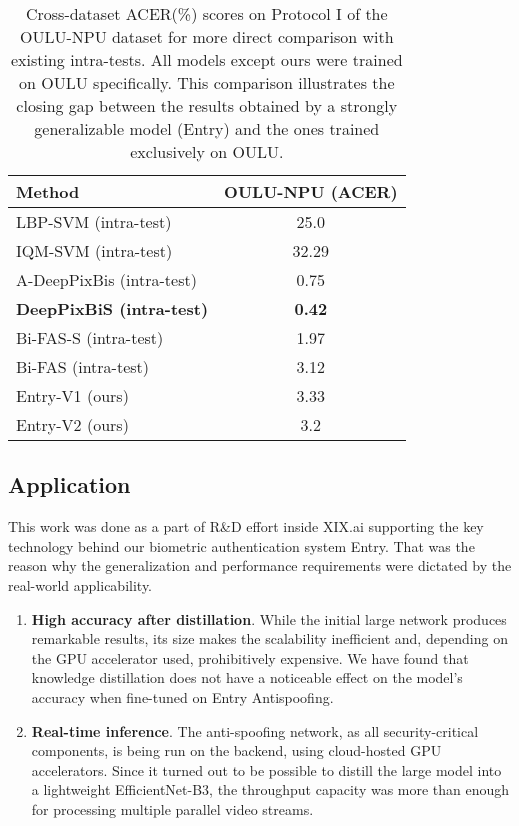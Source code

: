\documentclass[10pt,twocolumn,letterpaper]{article}
\begin{document}
\begin{table}[h]
  \centering
  \begin{tabular}{@{}lc@{}}
    \toprule
    \textbf{Method} & \textbf{OULU-NPU (ACER)} \\
    \midrule
    \midrule
    LBP-SVM (intra-test)\cite{DeepPix} & 25.0 \\
    IQM-SVM (intra-test)\cite{IQM} & 32.29 \\
    A-DeepPixBis (intra-test)\cite{DeepPixBis} & 0.75 \\
    \textbf{DeepPixBiS (intra-test)}\cite{DeepPix} & \textbf{0.42} \\
    Bi-FAS-S (intra-test)\cite{Bi-FPNFAS} & 1.97\\
    Bi-FAS (intra-test)\cite{Bi-FPNFAS} & 3.12\\
    Entry-V1 (ours) & 3.33 \\
    Entry-V2 (ours) & 3.2 \\
    \bottomrule
  \end{tabular}
  \caption{Cross-dataset ACER(\%) scores on Protocol I of the OULU-NPU dataset for more direct comparison with existing intra-tests. All models except ours were trained on OULU specifically. This comparison illustrates the closing gap between the results obtained by a strongly generalizable model (Entry) and the ones trained exclusively on OULU.}
  \label{tab:cross-test}
\end{table}

\subsection{Application}


This work was done as a part of R\&D effort inside XIX.ai supporting the key technology behind our biometric authentication system Entry. That was the reason why the generalization and performance requirements were dictated by the real-world applicability. 

\begin{enumerate}
    \item \textbf{High accuracy after distillation}. While the initial large network produces remarkable results, its size makes the scalability inefficient and, depending on the GPU accelerator used, prohibitively expensive. We have found that knowledge distillation does not have a noticeable effect on the model's accuracy when fine-tuned on Entry Antispoofing.
    \item \textbf{Real-time inference}. The anti-spoofing network, as all security-critical components, is being run on the backend, using cloud-hosted GPU accelerators. Since it turned out to be possible to distill the large model into a lightweight EfficientNet-B3, the throughput capacity was more than enough for processing multiple parallel video streams.
\end{enumerate}
\end{document}
